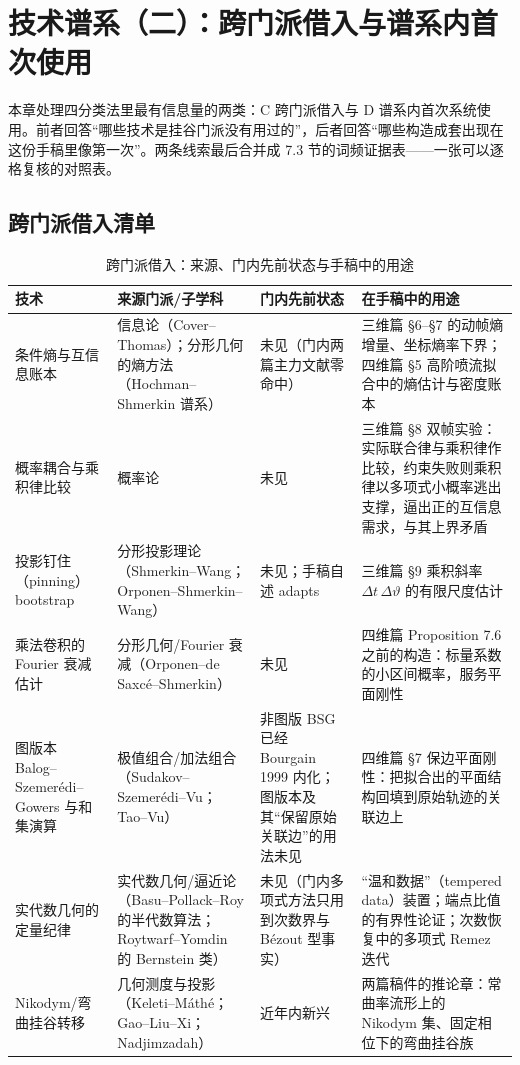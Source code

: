 \section{技术谱系（二）：跨门派借入与谱系内首次使用}

本章处理四分类法里最有信息量的两类：C 跨门派借入与 D 谱系内首次系统使用。前者回答“哪些技术是挂谷门派没有用过的”，后者回答“哪些构造成套出现在这份手稿里像第一次”。两条线索最后合并成 7.3 节的词频证据表——一张可以逐格复核的对照表。

\subsection{跨门派借入清单}

\begin{table}[t]
\centering
\caption{跨门派借入：来源、门内先前状态与手稿中的用途}
\label{tab:cross}
\footnotesize
\begin{tabularx}{\textwidth}{@{}L{2.9cm}L{2.6cm}L{2.6cm}Y@{}}
\toprule
{}\textbf{技术} & \textbf{来源门派/子学科} & \textbf{门内先前状态} & \textbf{在手稿中的用途} \\
\midrule
条件熵与互信息账本 & 信息论（Cover--Thomas）；分形几何的熵方法（Hochman--Shmerkin 谱系） & 未见（门内两篇主力文献零命中） & 三维篇 §6--§7 的动帧熵增量、坐标熵率下界；四维篇 §5 高阶喷流拟合中的熵估计与密度账本 \\
概率耦合与乘积律比较 & 概率论 & 未见 & 三维篇 §8 双帧实验：实际联合律与乘积律作比较，约束失败则乘积律以多项式小概率逃出支撑，逼出正的互信息需求，与其上界矛盾 \\
投影钉住（pinning）bootstrap & 分形投影理论（Shmerkin--Wang；Orponen--Shmerkin--Wang） & 未见；手稿自述 adapts & 三维篇 §9 乘积斜率 $\Delta t\,\Delta\vartheta$ 的有限尺度估计 \\
乘法卷积的 Fourier 衰减估计 & 分形几何/Fourier 衰减（Orponen--de Saxc\'e--Shmerkin） & 未见 & 四维篇 Proposition 7.6 之前的构造：标量系数的小区间概率，服务平面刚性 \\
图版本 Balog--Szemer\'edi--Gowers 与和集演算 & 极值组合/加法组合（Sudakov--Szemer\'edi--Vu；Tao--Vu） & 非图版 BSG 已经 Bourgain 1999 内化；图版本及其“保留原始关联边”的用法未见 & 四维篇 §7 保边平面刚性：把拟合出的平面结构回填到原始轨迹的关联边上 \\
实代数几何的定量纪律 & 实代数几何/逼近论（Basu--Pollack--Roy 的半代数算法；Roytwarf--Yomdin 的 Bernstein 类） & 未见（门内多项式方法只用到次数界与 Bézout 型事实） & “温和数据”（tempered data）装置；端点比值的有界性论证；次数恢复中的多项式 Remez 迭代 \\
Nikodym/弯曲挂谷转移 & 几何测度与投影（Keleti--M\'ath\'e；Gao--Liu--Xi；Nadjimzadah） & 近年内新兴 & 两篇稿件的推论章：常曲率流形上的 Nikodym 集、固定相位下的弯曲挂谷族 \\
\bottomrule
\end{tabularx}
\end{table}

